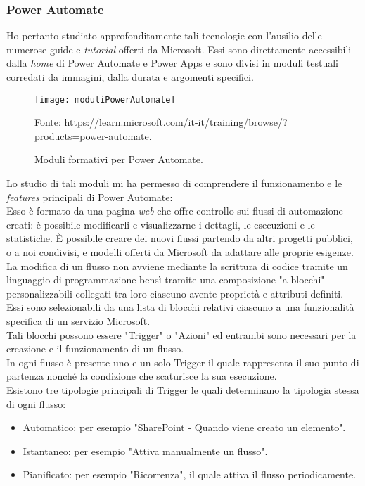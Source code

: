 \subsubsection*{Power Automate}
Ho pertanto studiato approfonditamente tali tecnologie con l'ausilio delle numerose guide e \emph{tutorial} offerti da Microsoft. 
Essi sono direttamente accessibili dalla \emph{home} di Power Automate e Power Apps e sono divisi in moduli testuali corredati da immagini, dalla durata e argomenti specifici. 

\begin{figure}[htbp] 
    \centering 
    \texttt{[image: moduliPowerAutomate]} 
    \caption{Moduli formativi per Power Automate.}
    \label{fig:moduliPowerAutomate}
    \vspace{1mm}
    Fonte: \url{https://learn.microsoft.com/it-it/training/browse/?products=power-automate}.
\end{figure}

\noindent Lo studio di tali moduli mi ha permesso di comprendere il funzionamento e le \emph{features} principali di Power Automate:\\
Esso è formato da una pagina \emph{web} che offre controllo sui flussi di automazione creati: è possibile modificarli e visualizzarne i dettagli, le esecuzioni e le statistiche. È possibile creare dei nuovi flussi partendo da altri progetti pubblici, o a noi condivisi, e modelli offerti da Microsoft da adattare alle proprie esigenze.\\
La modifica di un flusso non avviene mediante la scrittura di codice tramite un linguaggio di programmazione bensì tramite una composizione "a blocchi" personalizzabili collegati tra loro ciascuno avente proprietà e attributi definiti.\\
Essi sono selezionabili da una lista di blocchi relativi ciascuno a una funzionalità specifica di un servizio Microsoft.\\
Tali blocchi possono essere "Trigger" o "Azioni" ed entrambi sono necessari per la creazione e il funzionamento di un flusso.\\ 
In ogni flusso è presente uno e un solo Trigger il quale rappresenta il suo punto di partenza nonché la condizione che scaturisce la sua esecuzione.\\
Esistono tre tipologie principali di Trigger le quali determinano la tipologia stessa di ogni flusso:
\begin{itemize}
    \item Automatico: per esempio "SharePoint - Quando viene creato un elemento". 
    \item Istantaneo: per esempio "Attiva manualmente un flusso".
    \item Pianificato: per esempio "Ricorrenza", il quale attiva il flusso periodicamente.\\
\end{itemize}

